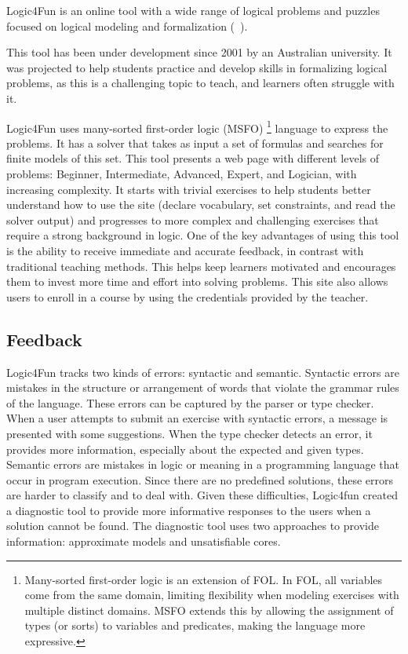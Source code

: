 Logic4Fun is an online tool with a wide range of logical problems and puzzles focused on logical modeling and formalization (~\cite{slaney_logic}).

This tool has been under development since 2001 by an Australian university. It was projected to help students practice and develop skills in formalizing logical problems, as this is a challenging topic to teach, and learners often struggle with it.

Logic4Fun uses many-sorted first-order logic (MSFO) \footnote{Many-sorted first-order logic is an extension of \gls{FOL}. In \gls{FOL}, all variables come from the same domain, limiting flexibility when modeling exercises with multiple distinct domains. MSFO extends this by allowing the assignment of types (or sorts) to variables and predicates, making the language more expressive.} language to express the problems. It has a solver that takes as input a set of formulas and searches for finite models of this set. This tool presents a web page with different levels of problems: Beginner, Intermediate, Advanced, Expert, and Logician, with increasing complexity. It starts with trivial exercises to help students better understand how to use the site (declare vocabulary, set constraints, and read the solver output) and progresses to more complex and challenging exercises that require a strong background in logic. One of the key advantages of using this tool is the ability to receive immediate and accurate feedback, in contrast with traditional teaching methods. This helps keep learners motivated and encourages them to invest more time and effort into solving problems. This site also allows users to enroll in a course by using the credentials provided by the teacher.

\subsection{Feedback}

Logic4Fun tracks two kinds of errors: syntactic and semantic. Syntactic errors are mistakes in the structure or arrangement of words that violate the grammar rules of the language. These errors can be captured by the parser or type checker. When a user attempts to submit an exercise with syntactic errors, a message is presented with some suggestions. When the type checker detects an error, it provides more information, especially about the expected and given types. Semantic errors are mistakes in logic or meaning in a programming language that occur in program execution. Since there are no predefined solutions, these errors are harder to classify and to deal with. Given these difficulties, Logic4fun created a diagnostic tool to provide more informative responses to the users when a solution cannot be found. The diagnostic tool uses two approaches to provide information: approximate models and unsatisfiable cores.

